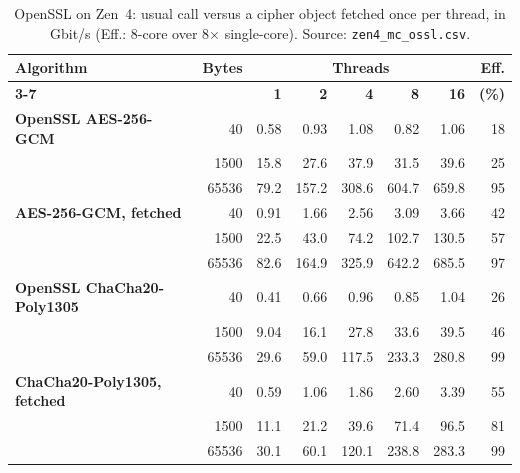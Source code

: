 \begin{table}[!htbp]
\centering
\caption{OpenSSL on Zen~4: usual call versus a cipher object fetched once per thread, in Gbit/s (Eff.: 8-core over 8$\times$ single-core). Source: \texttt{zen4\_mc\_ossl.csv}.}
\label{tab:s-mc-fetch}
\footnotesize
\begin{tabular}{@{}>{\bfseries}l r r r r r r r@{}}
\toprule
\textbf{Algorithm} & \textbf{Bytes} & \multicolumn{5}{c}{\textbf{Threads}} & \textbf{Eff.} \\
\cmidrule(lr){3-7}
& & \textbf{1} & \textbf{2} & \textbf{4} & \textbf{8} & \textbf{16} & \textbf{(\%)} \\
\midrule
OpenSSL AES-256-GCM & 40 & 0.58 & 0.93 & 1.08 & 0.82 & 1.06 & 18 \\
 & 1500 & 15.8 & 27.6 & 37.9 & 31.5 & 39.6 & 25 \\
 & 65536 & 79.2 & 157.2 & 308.6 & 604.7 & 659.8 & 95 \\
\addlinespace[2pt]
AES-256-GCM, fetched & 40 & 0.91 & 1.66 & 2.56 & 3.09 & 3.66 & 42 \\
 & 1500 & 22.5 & 43.0 & 74.2 & 102.7 & 130.5 & 57 \\
 & 65536 & 82.6 & 164.9 & 325.9 & 642.2 & 685.5 & 97 \\
\addlinespace[2pt]
OpenSSL ChaCha20-Poly1305 & 40 & 0.41 & 0.66 & 0.96 & 0.85 & 1.04 & 26 \\
 & 1500 & 9.04 & 16.1 & 27.8 & 33.6 & 39.5 & 46 \\
 & 65536 & 29.6 & 59.0 & 117.5 & 233.3 & 280.8 & 99 \\
\addlinespace[2pt]
ChaCha20-Poly1305, fetched & 40 & 0.59 & 1.06 & 1.86 & 2.60 & 3.39 & 55 \\
 & 1500 & 11.1 & 21.2 & 39.6 & 71.4 & 96.5 & 81 \\
 & 65536 & 30.1 & 60.1 & 120.1 & 238.8 & 283.3 & 99 \\
\bottomrule
\end{tabular}
\end{table}

